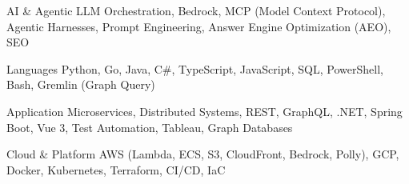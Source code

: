 
\begin{cvskills}

  \cvskill
    {AI \& Agentic}
    {LLM Orchestration, Bedrock, MCP (Model Context Protocol), Agentic Harnesses, Prompt Engineering, Answer Engine Optimization (AEO), SEO}

  \cvskill
    {Languages}
    {Python, Go, Java, C\#, TypeScript, JavaScript, SQL, PowerShell, Bash, Gremlin (Graph Query)}

  \cvskill
    {Application}
    {Microservices, Distributed Systems, REST, GraphQL, .NET, Spring Boot, Vue 3, Test Automation, Tableau, Graph Databases}

  \cvskill
    {Cloud \& Platform}
    {AWS (Lambda, ECS, S3, CloudFront, Bedrock, Polly), GCP, Docker, Kubernetes, Terraform, CI/CD, IaC}

\end{cvskills}
